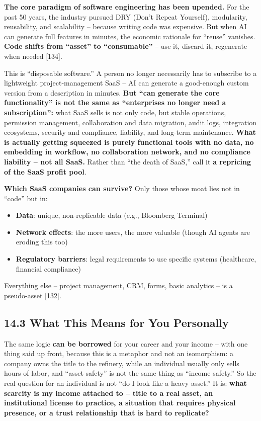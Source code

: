 \documentclass[11pt,a4paper]{article}
\begin{document}
\textbf{The core paradigm of software engineering has been upended.} For the past 50 years, the industry pursued DRY (Don't Repeat Yourself), modularity, reusability, and scalability -- because writing code was expensive. But when AI can generate full features in minutes, the economic rationale for ``reuse'' vanishes. \textbf{Code shifts from ``asset'' to ``consumable''} -- use it, discard it, regenerate when needed [134].

This is ``disposable software.'' A person no longer necessarily has to subscribe to a lightweight project-management SaaS -- AI can generate a good-enough custom version from a description in minutes. \textbf{But ``can generate the core functionality'' is not the same as ``enterprises no longer need a subscription'':} what SaaS sells is not only code, but stable operations, permission management, collaboration and data migration, audit logs, integration ecosystems, security and compliance, liability, and long-term maintenance. \textbf{What is actually getting squeezed is purely functional tools with no data, no embedding in workflow, no collaboration network, and no compliance liability -- not all SaaS.} Rather than ``the death of SaaS,'' call it \textbf{a repricing of the SaaS profit pool}.

\textbf{Which SaaS companies can survive?} Only those whose moat lies not in ``code'' but in:

\begin{itemize}
  \item \textbf{Data}: unique, non-replicable data (e.g., Bloomberg Terminal)
  \item \textbf{Network effects}: the more users, the more valuable (though AI agents are eroding this too)
  \item \textbf{Regulatory barriers}: legal requirements to use specific systems (healthcare, financial compliance)
\end{itemize}

Everything else -- project management, CRM, forms, basic analytics -- is a pseudo-asset [132].

\subsection{14.3 What This Means for You Personally}

The same logic \textbf{can be borrowed} for your career and your income -- with one thing said up front, because this is a metaphor and not an isomorphism: a company owns the title to the refinery, while an individual usually only sells hours of labor, and ``asset safety'' is not the same thing as ``income safety.'' So the real question for an individual is not ``do I look like a heavy asset.'' It is: \textbf{what scarcity is my income attached to -- title to a real asset, an institutional license to practice, a situation that requires physical presence, or a trust relationship that is hard to replicate?}
\end{document}
